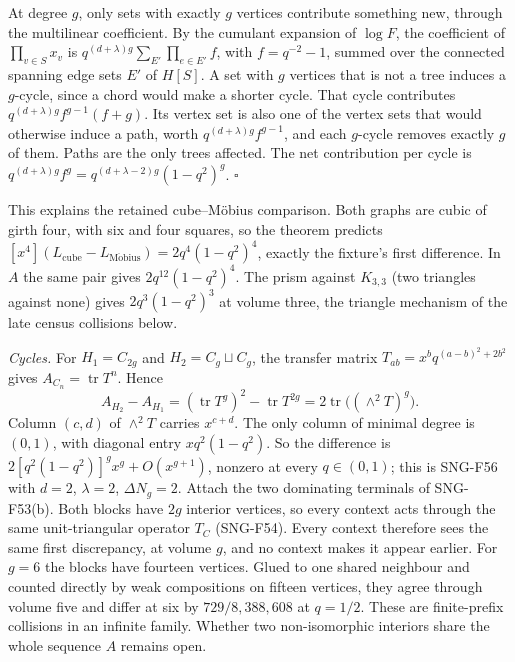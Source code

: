 \documentclass[
  11pt,
  a4paper,
]{report}
\begin{document}
At degree \(g\), only sets with exactly \(g\) vertices contribute
something new, through the multilinear coefficient. By the cumulant
expansion of \(\log F\), the coefficient of \(\prod_{v\in S}x_v\) is
\(q^{(d+\lambda)g}\sum_{E'}\prod_{e\in E'}f\), with \(f=q^{-2}-1\),
summed over the connected spanning edge sets \(E'\) of \(H[S]\). A set
with \(g\) vertices that is not a tree induces a \(g\)-cycle, since a
chord would make a shorter cycle. That cycle contributes
\(q^{(d+\lambda)g}f^{g-1}(f+g)\). Its vertex set is also one of the
vertex sets that would otherwise induce a path, worth
\(q^{(d+\lambda)g}f^{g-1}\), and each \(g\)-cycle removes exactly \(g\)
of them. Paths are the only trees affected. The net contribution per
cycle is \(q^{(d+\lambda)g}f^g=q^{(d+\lambda-2)g}(1-q^2)^g\).
\(\square\)

This explains the retained cube--Möbius comparison. Both graphs are
cubic of girth four, with six and four squares, so the theorem predicts
\([x^4](L_{\mathrm{cube}}-L_{\mathrm{M\ddot obius}})=2q^4(1-q^2)^4\),
exactly the fixture's first difference. In \(A\) the same pair gives
\(2q^{12}(1-q^2)^4\). The prism against \(K_{3,3}\) (two triangles
against none) gives \(2q^3(1-q^2)^3\) at volume three, the triangle
mechanism of the late census collisions below.

\emph{Cycles.} For \(H_1=C_{2g}\) and \(H_2=C_g\sqcup C_g\), the
transfer matrix \(T_{ab}=x^bq^{(a-b)^2+2b^2}\) gives
\(A_{C_n}=\operatorname{tr}T^n\). Hence \[
A_{H_2}-A_{H_1}=(\operatorname{tr}T^g)^2-\operatorname{tr}T^{2g}=2\operatorname{tr}\bigl((\wedge^2T)^g\bigr).
\] Column \((c,d)\) of \(\wedge^2T\) carries \(x^{c+d}\). The only
column of minimal degree is \((0,1)\), with diagonal entry
\(xq^2(1-q^2)\). So the difference is \(2[q^2(1-q^2)]^gx^g+O(x^{g+1})\),
nonzero at every \(q\in(0,1)\); this is SNG-F56 with \(d=2\),
\(\lambda=2\), \(\Delta N_g=2\). Attach the two dominating terminals of
SNG-F53(b). Both blocks have \(2g\) interior vertices, so every context
acts through the same unit-triangular operator \(T_C\) (SNG-F54). Every
context therefore sees the same first discrepancy, at volume \(g\), and
no context makes it appear earlier. For \(g=6\) the blocks have fourteen
vertices. Glued to one shared neighbour and counted directly by weak
compositions on fifteen vertices, they agree through volume five and
differ at six by \(729/8{,}388{,}608\) at \(q=1/2\). These are
finite-prefix collisions in an infinite family. Whether two
non-isomorphic interiors share the whole sequence \(A\) remains open.
\end{document}
